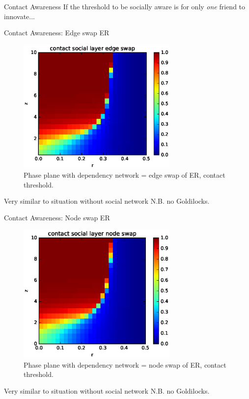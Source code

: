 \documentclass[10pt, xcolor=dvipsnames, handout]{beamer}
\begin{document}
\begin{frame}{Contact Awareness}
If the threshold to be socially aware is for only \emph{one} friend to innovate...
\end{frame}
\begin{frame}{Contact Awareness: Edge swap ER}

\begin{figure}
\centering
\includegraphics[width=0.7\textwidth]{figures/hetero_edge_swap_ER}
\caption{Phase plane with dependency network = edge swap of ER, contact threshold.}
\end{figure}
Very similar to situation without social network N.B. no Goldilocks.

\end{frame}


\begin{frame}{Contact Awareness: Node swap ER}
\begin{figure}
\centering
\includegraphics[width=0.7\textwidth]{figures/hetero_node_swap_ER}
\caption{Phase plane with dependency network = node swap of ER, contact threshold.}
\end{figure}
Very similar to situation without social network N.B. no Goldilocks.

\end{frame}
\end{document}
